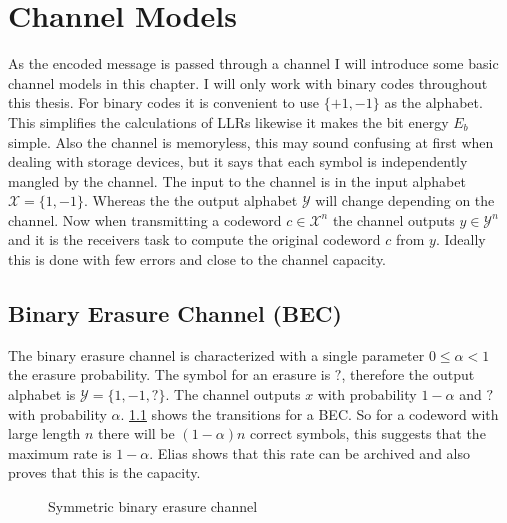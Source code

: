 
\chapter{Channel Models}
As the encoded message is passed through a channel I will introduce some basic channel models in this chapter. I will only work with binary codes throughout this thesis. For binary codes it is convenient to use $\{ +1, -1\}$
 as the alphabet. This simplifies the calculations of LLRs likewise it makes the bit energy $E_b$ simple. Also the channel is memoryless, this may sound confusing at first when dealing with storage devices, but it says that each symbol is independently mangled by the channel. The input to the channel is in the input alphabet $\mathcal{X} = \{1, -1\}$. Whereas the the output alphabet $\mathcal{Y}$ will change depending on the channel. Now when transmitting a codeword $c \in \mathcal{X}^n$ the channel outputs $y \in \mathcal{Y}^n$ and it is the receivers task to compute the original codeword $c$ from $y$. Ideally this is done with few errors and close to the channel capacity.

\section{Binary Erasure Channel (BEC)}
The binary erasure channel is characterized with a single parameter $0 \leq \alpha < 1$ the erasure probability. The symbol for an erasure is $?$, therefore the output alphabet is $\mathcal{Y} = \{1, -1, ?\}$. The channel outputs $x$ with probability $1 - \alpha$ and $?$ with probability $\alpha$. \cref{bec_schema} shows the transitions for a BEC. So for a codeword with large length $n$ there will be $(1 - \alpha)n$ correct symbols, this suggests that the maximum rate is $1 - \alpha$. Elias\cite{El55} shows that this rate can be archived and also proves that this is the capacity.

\begin{figure}
	\centering
	\caption{Symmetric binary erasure channel}
	\label{bec_schema}
\end{figure}


